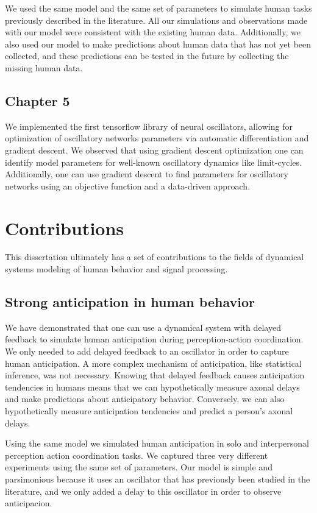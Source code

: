\documentclass{report}
\begin{document}
We used the same model and the same set of parameters to simulate human tasks previously described in the literature. All our simulations and observations made with our model were consistent with the existing human data. Additionally, we also used our model to make predictions about human data that has not yet been collected, and these predictions can be tested in the future by collecting the missing human data.
    
\subsection{Chapter 5}
We implemented the first tensorflow library of neural oscillators, allowing for optimization of oscillatory networks parameters via automatic differentiation and gradient descent. We observed that using gradient descent optimization one can identify model parameters for well-known oscillatory dynamics like limit-cycles. Additionally, one can use gradient descent to find parameters for oscillatory networks using an objective function and a data-driven approach.

\section{Contributions}
This dissertation ultimately has a set of contributions to the fields of dynamical systems modeling of human behavior and signal processing. 

\subsection{Strong anticipation in human behavior}
We have demonstrated that one can use a dynamical system with delayed feedback to simulate human anticipation during perception-action coordination. We only needed to add delayed feedback to an oscillator in order to capture human anticipation. A more complex mechanism of anticipation, like statistical inference, was not necessary. Knowing that delayed feedback causes anticipation tendencies in humans means that we can hypothetically measure axonal delays and make predictions about anticipatory behavior. Conversely, we can also hypothetically measure anticipation tendencies and predict a person's axonal delays. 

Using the same model we simulated human anticipation in solo and interpersonal perception action coordination tasks. We captured three very different experiments using the same set of parameters. Our model is simple and parsimonious because it uses an oscillator that has previously been studied in the literature, and we only added a delay to this oscillator in order to observe anticipacion. 
\end{document}
